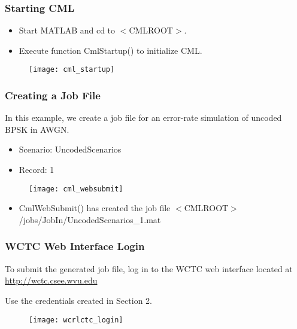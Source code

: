 \begin{frame}
  \frametitle{ Starting CML }

  \begin{itemize}
  \item Start MATLAB and cd to $<$CMLROOT$>$.
  \item Execute function CmlStartup() to initialize CML.
  \end{itemize}

  \begin{figure}
    \centering
    \texttt{[image: cml\_startup]}
  \end{figure}

\end{frame}




\begin{frame}
  \frametitle{ Creating a Job File }

  In this example, we create a job file for an error-rate simulation of uncoded BPSK in AWGN.
  \begin{itemize}
  \item Scenario: UncodedScenarios
  \item Record: 1
  \end{itemize}

  \begin{figure}
    \centering
    \texttt{[image: cml\_websubmit]}
  \end{figure}

  \begin{itemize}
  \item CmlWebSubmit() has created the job file $<$CMLROOT$>$/jobs/JobIn/UncodedScenarios\_1.mat
  \end{itemize}

\end{frame}




\begin{frame}
  \frametitle{WCTC Web Interface Login}

  \begin{itemize_loose}
  \item To submit the generated job file, log in to the WCTC web interface located at
    \\ \url{http://wctc.csee.wvu.edu}
  \item Use the credentials created in Section 2.
  \end{itemize_loose}

  \centering
  \begin{figure}
    \texttt{[image: wcrlctc\_login]}
  \end{figure}

\end{frame}




